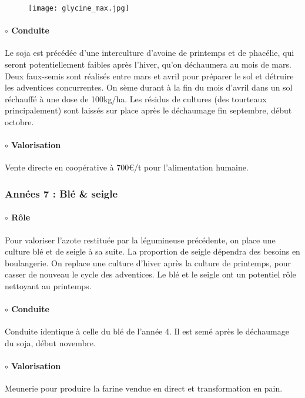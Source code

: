 \documentclass{book}
\begin{document}
\begin{figure}[h!]
\begin{center}
	\texttt{[image: glycine\_max.jpg]}
\end{center}
\end{figure}

\paragraph{$\circ$ Conduite} Le soja est précédée d'une interculture d'avoine de printemps et de phacélie, qui seront potentiellement faibles après l'hiver, qu'on déchaumera au mois de mars. Deux faux-semis sont réalisés entre mars et avril pour préparer le sol et détruire les adventices concurrentes. On sème durant à la fin du mois d'avril dans un sol réchauffé à une dose de 100kg/ha. Les résidus de cultures (des tourteaux principalement) sont laissés sur place après le déchaumage fin septembre, début octobre.

\paragraph{$\circ$ Valorisation} Vente directe en coopérative à 700\euro{}/t pour l'alimentation humaine.

\subsubsection{Années 7 : Blé \& seigle}

\paragraph{$\circ$ Rôle} Pour valoriser l'azote restituée par la légumineuse précédente, on place une culture blé et de seigle à sa suite. La proportion de seigle dépendra des besoins en boulangerie. On replace une culture d'hiver après la culture de printemps, pour casser de nouveau le cycle des adventices. Le blé et le seigle ont un potentiel rôle nettoyant au printemps.

\paragraph{$\circ$ Conduite} Conduite identique à celle du blé de l'année 4. Il est semé après le déchaumage du soja, début novembre.

\paragraph{$\circ$ Valorisation} Meunerie pour produire la farine vendue en direct et transformation en pain.
\end{document}
